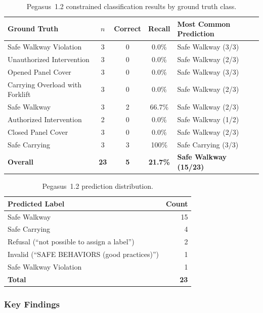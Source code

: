 \documentclass[11pt,a4paper]{article}
\begin{document}
\begin{table}[H]
\centering
\caption{Pegasus~1.2 constrained classification results by ground truth class.}
\label{tab:pegasus_constrained}
\begin{tabular}{@{}p{5.5cm}cccl@{}}
\toprule
\textbf{Ground Truth} & \textbf{$n$} & \textbf{Correct} & \textbf{Recall} & \textbf{Most Common Prediction} \\
\midrule
Safe Walkway Violation & 3 & 0 & 0.0\% & Safe Walkway (3/3) \\
Unauthorized Intervention & 3 & 0 & 0.0\% & Safe Walkway (2/3) \\
Opened Panel Cover & 3 & 0 & 0.0\% & Safe Walkway (3/3) \\
Carrying Overload with Forklift & 3 & 0 & 0.0\% & Safe Walkway (2/3) \\
\midrule
Safe Walkway & 3 & 2 & 66.7\% & Safe Walkway (2/3) \\
Authorized Intervention & 2 & 0 & 0.0\% & Safe Walkway (1/2) \\
Closed Panel Cover & 3 & 0 & 0.0\% & Safe Walkway (2/3) \\
Safe Carrying & 3 & 3 & 100\% & Safe Carrying (3/3) \\
\midrule
\textbf{Overall} & \textbf{23} & \textbf{5} & \textbf{21.7\%} & \textbf{Safe Walkway (15/23)} \\
\bottomrule
\end{tabular}
\end{table}

\begin{table}[H]
\centering
\caption{Pegasus~1.2 prediction distribution.}
\label{tab:pred_dist}
\begin{tabular}{@{}lr@{}}
\toprule
\textbf{Predicted Label} & \textbf{Count} \\
\midrule
Safe Walkway & 15 \\
Safe Carrying & 4 \\
Refusal (``not possible to assign a label'') & 2 \\
Invalid (``SAFE BEHAVIORS (good practices)'') & 1 \\
Safe Walkway Violation & 1 \\
\midrule
\textbf{Total} & \textbf{23} \\
\bottomrule
\end{tabular}
\end{table}

\subsubsection{Key Findings}
\end{document}
